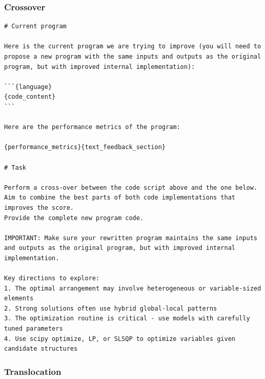 \documentclass{llmxive}
\begin{document}
\subsubsection{Crossover}
\label{app:prompts:crossover}


\begin{ttcolorbox}
\begin{lstlisting}[style=prompt]
# Current program

Here is the current program we are trying to improve (you will need to propose a new program with the same inputs and outputs as the original program, but with improved internal implementation):

```{language}
{code_content}
```

Here are the performance metrics of the program:

{performance_metrics}{text_feedback_section}

# Task

Perform a cross-over between the code script above and the one below. Aim to combine the best parts of both code implementations that improves the score.
Provide the complete new program code.

IMPORTANT: Make sure your rewritten program maintains the same inputs and outputs as the original program, but with improved internal implementation.

Key directions to explore:
1. The optimal arrangement may involve heterogeneous or variable-sized elements
2. Strong solutions often use hybrid global-local patterns
3. The optimization routine is critical - use models with carefully tuned parameters
4. Use scipy optimize, LP, or SLSQP to optimize variables given candidate structures
\end{lstlisting}
\end{ttcolorbox}


\subsubsection{Translocation}
\label{app:prompts:translocation}
\end{document}
